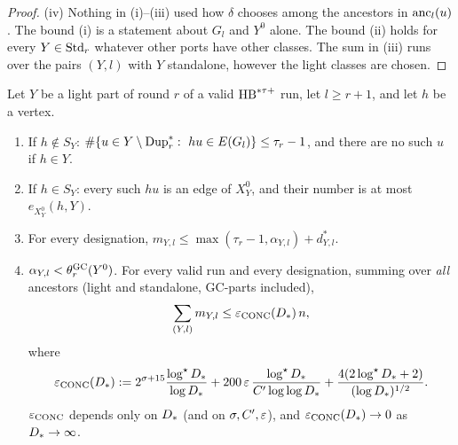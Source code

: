 \begin{proof}
(iv) Nothing in (i)--(iii) used how $\delta$ chooses among the ancestors in $\mathrm{anc}_l(u)$. The bound (i) is a statement about $G_l$ and $Y^0$ alone. The bound (ii) holds for every $Y\in\mathrm{Std}_r$ whatever other ports have other classes. The sum in (iii) runs over the pairs $(Y,l)$ with $Y$ standalone, however the light classes are chosen.
\end{proof}

\begin{theorem}\label{s6:thmCONCL}
Let $Y$ be a light part of round $r$ of a valid $\mathrm{HB}^{*\tau{+}}$ run, let $l\ge r+1$, and let $h$ be a vertex.
\begin{enumerate}
\item[(i)] If $h\notin S_Y$: $\#\{u\in Y\setminus\mathrm{Dup}^{*}_r:\ hu\in E(G_l)\}\le\tau_r-1$, and there are no such $u$ if $h\in Y$.
\item[(ii)] If $h\in S_Y$: every such $hu$ is an edge of $X^0_Y$, and their number is at most $e_{X^0_Y}(h,Y)$.
\item[(iii)] For every designation, $m_{Y,l}\le\max(\tau_r-1,\alpha_{Y,l})+d^*_{Y,l}$.
\item[(iv)] $\alpha_{Y,l}<\theta^{\mathrm{GC}}_r(Y^0)$. For every valid run and every designation, summing over \emph{all} ancestors (light and standalone, GC-parts included),
\[
\sum_{(Y,l)}m_{Y,l}\le\varepsilon_{\mathrm{CONC}}(D_{*})\,n,
\]
where
\[
\varepsilon_{\mathrm{CONC}}(D_{*}):=2^{\sigma+15}\frac{\log^{\star}D_{*}}{\log D_{*}}+200\,\varepsilon\,\frac{\log^{\star}D_{*}}{C'\log\log D_{*}}+\frac{4(2\log^{\star}D_{*}+2)}{(\log D_{*})^{1/2}}.
\]
$\varepsilon_{\mathrm{CONC}}$ depends only on $D_{*}$ (and on $\sigma,C',\varepsilon$), and $\varepsilon_{\mathrm{CONC}}(D_{*})\to0$ as $D_{*}\to\infty$.
\end{enumerate}
\deps{\ref{s2:propOrigin}, \ref{s2:lemSEP}, \ref{s2:lemThinCut}, \ref{s2:lemGC}, \ref{s2:lemEL}, \ref{s2:lemTower}, \ref{s2:lemLacunary}, \ref{s6:thmCONC}, \ref{s2:propOV}, \ref{s2:defHBtp}, \ref{s6:defDesign}, \ref{s1:condG1}}
\end{theorem}

